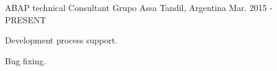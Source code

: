 


\begin{cventries}


\cventry
{ABAP technical Consultant} %
{Grupo Assa} %
{Tandil, Argentina} %
{Mar. 2015 - PRESENT} %
{ %
\begin{cvitems}
\item {Development process support.}
\item {Bug fixing.}
\end{cvitems}
}



\end{cventries}
